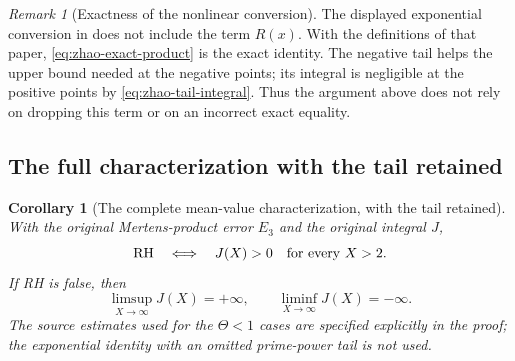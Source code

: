 \documentclass[11pt,a4paper]{article}
\numberwithin{equation}{section}
\newtheorem{corollary}[theorem]{Corollary}
\theoremstyle{definition}\newtheorem{definition}[theorem]{Definition}
\theoremstyle{remark}\newtheorem{remark}[theorem]{Remark}
\begin{document}
\begin{remark}[Exactness of the nonlinear conversion]
The displayed exponential conversion in \cite[Section~4]{Zhao2025}
does not include the term $R(x)$. With the definitions of that paper,
\eqref{eq:zhao-exact-product} is the exact identity. The negative
tail helps the upper bound needed at the negative points; its
integral is negligible at the positive points by
\eqref{eq:zhao-tail-integral}. Thus the argument above does not
rely on dropping this term or on an incorrect exact equality.
\end{remark}


\subsection{The full characterization with the tail retained}

\begin{corollary}[The complete mean-value characterization, with the tail retained]
\label{cor:zhao-complete-characterization}
With the original Mertens-product error $E_3$ and the original integral $J$,
\[
 \mathrm{RH}
 \quad\Longleftrightarrow\quad
 J(X)>0\quad\hbox{for every }X>2.
\]
If RH is false, then
\[
 \limsup_{X\to\infty}J(X)=+\infty,
 \qquad
 \liminf_{X\to\infty}J(X)=-\infty.
\]
The source estimates used for the $\Theta<1$ cases are specified explicitly
in the proof; the exponential identity with an omitted prime-power tail
is not used.
\end{corollary}
\end{document}

